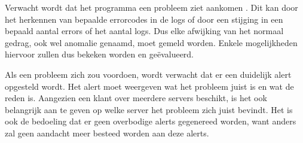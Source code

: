 Verwacht wordt dat het programma een probleem ziet aankomen \autocite{anomalydetection}. Dit kan door het herkennen van bepaalde errorcodes in de logs of door een stijging in een bepaald aantal errors of het aantal logs. Dus elke afwijking van het normaal gedrag, ook wel anomalie genaamd, moet gemeld worden. Enkele mogelijkheden hiervoor zullen dus bekeken worden en geëvalueerd.

Als een probleem zich zou voordoen, wordt verwacht dat er een duidelijk alert opgesteld wordt. Het alert moet weergeven wat het probleem juist is en wat de reden is. Aangezien een klant over meerdere servers beschikt, is het ook belangrijk aan te geven op welke server het probleem zich juist bevindt. Het is ook de bedoeling dat er geen overbodige alerts gegenereed worden, want anders zal geen aandacht meer besteed worden aan deze alerts.
